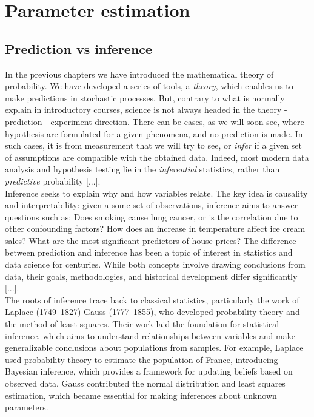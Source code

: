 \documentclass{book}
\begin{document}
\chapter{Parameter estimation}

\section{Prediction vs inference}

In the previous chapters we have introduced the mathematical theory of probability. We have developed a series of tools, a \textit{theory}, which enables us to make predictions in stochastic processes. But, contrary to what is normally explain in introductory courses, science is not always headed in the theory - prediction - experiment direction. There can be cases, as we will soon see, where hypothesis are formulated for a given phenomena, and no prediction is made. In such cases, it is from measurement that we will try to see, or \textit{infer} if a given set of assumptions are compatible with the obtained data. Indeed, most modern data analysis and hypothesis testing lie in the \textit{inferential} statistics, rather than \textit{predictive} probability [...].\\

Inference seeks to explain why and how variables relate. The key idea is causality and interpretability: given a some set of observations, inference aims to answer questions such as: Does smoking cause lung cancer, or is the correlation due to other confounding factors? How does an increase in temperature affect ice cream sales? What are the most significant predictors of house prices? The difference between prediction and inference has been a topic of interest in statistics and data science for centuries. While both concepts involve drawing conclusions from data, their goals, methodologies, and historical development differ significantly [...].\\

The roots of inference trace back to classical statistics, particularly the work of Laplace (1749–1827) Gauss (1777–1855), who developed probability theory and the method of least squares. Their work laid the foundation for statistical inference, which aims to understand relationships between variables and make generalizable conclusions about populations from samples. For example, Laplace used probability theory to estimate the population of France, introducing Bayesian inference, which provides a framework for updating beliefs based on observed data. Gauss contributed the normal distribution and least squares estimation, which became essential for making inferences about unknown parameters.
\end{document}
